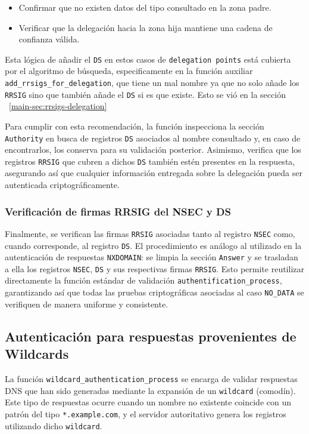 \begin{itemize}
    \item Confirmar que no existen datos del tipo consultado en la zona padre.
    \item Verificar que la delegación hacia la zona hija mantiene una cadena de confianza válida.
\end{itemize}

Esta lógica de añadir el \texttt{DS} en estos casos de \texttt{delegation points} está cubierta por el algoritmo de búsqueda, especificamente en la función auxiliar \texttt{add\_rrsigs\_for\_delegation},
que tiene un mal nombre ya que no solo añade los \texttt{RRSIG} sino que también añade el \texttt{DS} si es que existe. Esto se vió en la sección ~\ref{main-sec:rrsigs-delegation}

Para cumplir con esta recomendación, la función inspecciona la sección \texttt{Authority} en busca de registros \texttt{DS} asociados al nombre consultado y, en caso de encontrarlos, los 
conserva para su validación posterior. Asimismo, verifica que los registros \texttt{RRSIG} que cubren a dichos \texttt{DS} también estén presentes en la respuesta, asegurando así que cualquier 
información entregada sobre la delegación pueda ser autenticada criptográficamente.

\subsubsection{Verificación de firmas RRSIG del NSEC y DS}

Finalmente, se verifican las firmas \texttt{RRSIG} asociadas tanto al registro \texttt{NSEC} como, cuando corresponde, al registro \texttt{DS}. El procedimiento es análogo al utilizado en la 
autenticación de respuestas \texttt{NXDOMAIN}: se limpia la sección \texttt{Answer} y se trasladan a ella los registros \texttt{NSEC}, \texttt{DS} y sus respectivas firmas \texttt{RRSIG}. 
Esto permite reutilizar directamente la función estándar de validación \texttt{authentification\_process}, garantizando así que todas las pruebas criptográficas asociadas al caso \texttt{NO\_DATA} 
se verifiquen de manera uniforme y consistente.


\subsection{Autenticación para respuestas provenientes de Wildcards}

La función \texttt{wildcard\_authentication\_process} se encarga de validar respuestas DNS que han sido generadas mediante la expansión de un \texttt{wildcard} (comodín).
Este tipo de respuestas ocurre cuando un nombre no existente coincide con un patrón del tipo \texttt{*.example.com}, y el servidor autoritativo genera los registros utilizando dicho \texttt{wildcard}.


